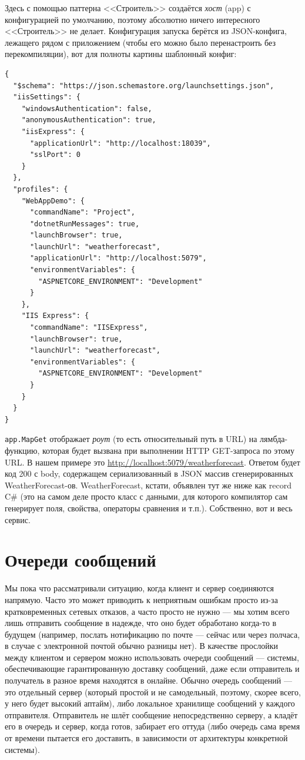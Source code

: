 \documentclass[a5paper]{article}
\begin{document}
Здесь с помощью паттерна <<Строитель>> создаётся \emph{хост} (app) с конфигурацией по умолчанию, поэтому абсолютно ничего интересного <<Строитель>> не делает. Конфигурация запуска берётся из JSON-конфига, лежащего рядом с приложением (чтобы его можно было перенастроить без перекомпиляции), вот для полноты картины шаблонный конфиг:

\begin{footnotesize}
    \begin{verbatim}
{
  "$schema": "https://json.schemastore.org/launchsettings.json",
  "iisSettings": {
    "windowsAuthentication": false,
    "anonymousAuthentication": true,
    "iisExpress": {
      "applicationUrl": "http://localhost:18039",
      "sslPort": 0
    }
  },
  "profiles": {
    "WebAppDemo": {
      "commandName": "Project",
      "dotnetRunMessages": true,
      "launchBrowser": true,
      "launchUrl": "weatherforecast",
      "applicationUrl": "http://localhost:5079",
      "environmentVariables": {
        "ASPNETCORE_ENVIRONMENT": "Development"
      }
    },
    "IIS Express": {
      "commandName": "IISExpress",
      "launchBrowser": true,
      "launchUrl": "weatherforecast",
      "environmentVariables": {
        "ASPNETCORE_ENVIRONMENT": "Development"
      }
    }
  }
}
    \end{verbatim}
\end{footnotesize}

\verb|app.MapGet| отображает \emph{роут} (то есть относительный путь в URL) на лямбда-функцию, которая будет вызвана при выполнении HTTP GET-запроса по этому URL. В нашем примере это \url{http://localhost:5079/weatherforecast}. Ответом будет код 200 с body, содержащем сериализованный в JSON массив сгенерированных WeatherForecast-ов. WeatherForecast, кстати, объявлен тут же ниже как record C\# (это на самом деле просто класс с данными, для которого компилятор сам генерирует поля, свойства, операторы сравнения и т.п.). Собственно, вот и весь сервис.

\section{Очереди сообщений}

Мы пока что рассматривали ситуацию, когда клиент и сервер соединяются напрямую. Часто это может приводить к неприятным ошибкам просто из-за кратковременных сетевых отказов, а часто просто не нужно --- мы хотим всего лишь отправить сообщение в надежде, что оно будет обработано когда-то в будущем (например, послать нотификацию по почте --- сейчас или через полчаса, в случае с электронной почтой обычно разницы нет). В качестве прослойки между клиентом и сервером можно использовать очереди сообщений --- системы, обеспечивающие гарантированную доставку сообщений, даже если отправитель и получатель в разное время находятся в онлайне. Обычно очередь сообщений --- это отдельный сервер (который простой и не самодельный, поэтому, скорее всего, у него будет высокий аптайм), либо локальное хранилище сообщений у каждого отправителя. Отправитель не шлёт сообщение непосредственно серверу, а кладёт его в очередь и сервер, когда готов, забирает его оттуда (либо очередь сама время от времени пытается его доставить, в зависимости от архитектуры конкретной системы).
\end{document}
